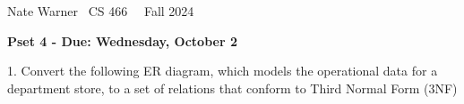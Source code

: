 \documentclass{report}
\title{\Huge{}}
\author{\huge{Nathan Warner}}
\date{\huge{}}
\begin{document}
    \pagebreak \bigbreak \noindent
    Nate Warner \ \quad \quad \quad \quad \quad \quad \quad \quad \quad \quad \quad \quad  CS 466 \quad  \quad \quad \quad \quad \quad \quad \quad \quad \ \ \quad \quad Fall 2024
    \begin{center}
        \textbf{Pset 4 - Due: Wednesday, October 2}
    \end{center}
    \bigbreak \noindent 
    \begin{mdframed}
        1. Convert the following ER diagram, which models the operational data for a department store, to a set of relations that conform to Third Normal Form (3NF)
    \end{mdframed}
    \bigbreak \noindent 
\end{document}
